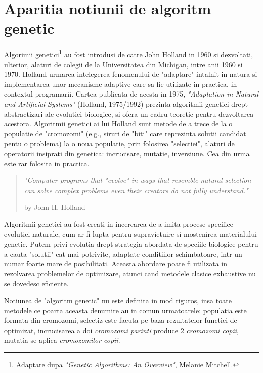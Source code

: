 \section{Aparitia notiunii de algoritm genetic}

Algorimii genetici\footnote{Adaptare dupa \textit{"Genetic Algorithms: An Overview"}, Melanie Mitchell.} au fost introdusi de catre John Holland in 1960 si dezvoltati, ulterior, alaturi de colegii de la Universitatea din Michigan, intre anii 1960 si 1970. Holland urmarea intelegerea fenomenului de "adaptare" intalnit in natura si implementarea unor mecanisme adaptive care sa fie utilizate in practica, in contextul programarii. Cartea publicata de acesta in 1975, \textit{"Adaptation in Natural and Artificial Systems"} (Holland, 1975/1992) prezinta algoritmii genetici drept abstractizari ale evolutiei biologice, si ofera un cadru teoretic pentru dezvoltarea acestora. Algoritmii genetici ai lui Holland sunt metode de a trece de la o populatie de "cromozomi" (e.g., siruri de "biti" care reprezinta solutii candidat pentu o problema) la o noua populatie, prin folosirea "selectiei", alaturi de operatorii insiprati din genetica: incrucisare, mutatie, inversiune. Cea din urma este rar folosita in practica.

\begin{quote} 
	\textit{"Computer programs that "evolve" in ways that resemble natural selection can solve complex problems even their creators do not fully understand."}
	\begin{flushright}
		by John H. Holland 
	\end{flushright}
\end{quote}

Algoritmii genetici au fost creati in incercarea de a imita procese specifice evolutiei naturale, cum ar fi lupta pentru supravietuire si mostenirea materialului genetic. Putem privi evolutia drept strategia abordata de speciile biologice pentru a cauta "solutii" cat mai potrivite, adaptate conditiilor schimbatoare, intr-un numar foarte mare de posibilitati. Aceasta abordare poate fi utilizata in rezolvarea problemelor de optimizare, atunci cand metodele clasice exhaustive nu se dovedesc eficiente.

Notiunea de "algoritm genetic" nu este definita in mod riguros\cite{introduction_by_melanie_mitchell}, insa toate metodele ce poarta aceasta denumire au in comun urmatoarele: populatia este formata din cromozomi, selectiz este facuta pe baza rezultatelor functiei de optimizat, incrucisarea a doi \textit{cromozomi parinti} produce 2 \textit{cromozomi copii}, mutatia se aplica \textit{cromozomilor copii}.

